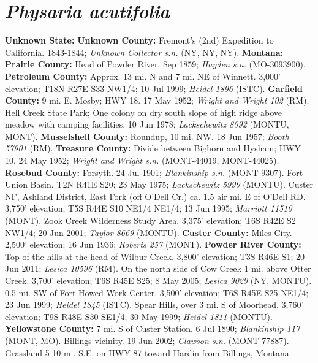 \section*{\textit{Physaria acutifolia}}

  \textbf{Unknown State:}
  \textbf{Unknown County:}
Fremont's (2nd) Expedition to California. 1843-1844;
\textit{Unknown Collector s.n.} (NY, NY, NY).
  \textbf{Montana:}
  \textbf{Prairie County:}
Head of Powder River. Sep 1859; \textit{Hayden s.n.} (MO-3093900).
  \textbf{Petroleum County:}
Approx. 13 mi. N and 7 mi. NE of Winnett. 3,000' elevation; T18N R27E S33 NW1/4;
10 Jul 1999; \textit{Heidel 1896} (ISTC).
  \textbf{Garfield County:}
9 mi. E. Mosby; HWY 18. 17 May 1952; \textit{Wright and Wright 102} (RM).
Hell Creek State Park; One colony on dry south slope of high ridge above meadow
with camping facilities. 10 Jun 1978; \textit{Lackschewitz 8092} (MONTU, MONT).
  \textbf{Musselshell County:}
Roundup, 10 mi. NW. 18 Jun 1957; \textit{Booth 57901} (RM).
  \textbf{Treasure County:}
Divide between Bighorn and Hysham; HWY 10. 24 May 1952;
\textit{Wright and Wright s.n.} (MONT-44019, MONT-44025).
  \textbf{Rosebud County:}
Forsyth. 24 Jul 1901; \textit{Blankinship s.n.} (MONT-9307).
Fort Union Basin. T2N R41E S20; 23 May 1975; \textit{Lackschewitz 5999} (MONTU).
Custer NF, Ashland District, East Fork (off O'Dell Cr.) ca. 1.5 air mi.
E of O'Dell RD. 3,750' elevation; T5S R44E S10 NE1/4 NE1/4; 13 Jun 1995;
\textit{Marriott 11510} (MONT).
Zook Creek Wilderness Study Area. 3,375' elevation; T6S R42E S2 NW1/4;
20 Jun 2001; \textit{Taylor 8669} (MONTU).
  \textbf{Custer County:}
Miles City. 2,500' elevation; 16 Jun 1936; \textit{Roberts 257} (MONT).
  \textbf{Powder River County:}
Top of the hills at the head of Wilbur Creek. 3,800' elevation; T3S R46E S1;
20 Jun 2011; \textit{Lesica 10596} (RM).
On the north side of Cow Creek 1 mi. above Otter Creek. 3,700' elevation;
T6S R45E S25; 8 May 2005; \textit{Lesica 9029} (NY, MONTU).
0.5 mi. SW of Fort Howed Work Center. 3,500' elevation; T6S R45E S25 NE1/4;
23 Jun 1999; \textit{Heidel 1845} (ISTC).
Spear Hills, over 3 mi. S of Moorhead. 3,760' elevation; T9S R48E S30 SE1/4;
30 May 1999; \textit{Heidel 1811} (MONTU).
  \textbf{Yellowstone County:}
7 mi. S of Custer Station. 6 Jul 1890; \textit{Blankinship 117} (MONT, MO).
Billings vicinity. 19 Jun 2002; \textit{Clawson s.n.} (MONT-77887).
Grassland 5-10 mi. S.E. on HWY 87 toward Hardin from Billings, Montana.
